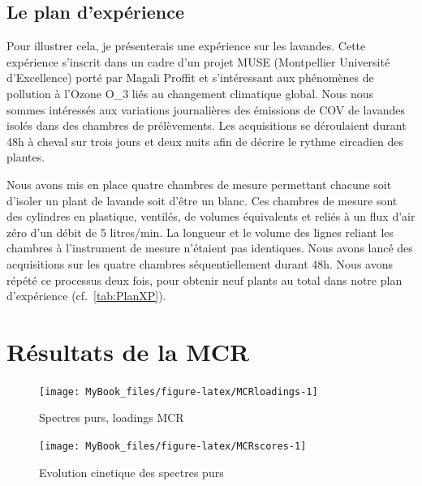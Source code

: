 \documentclass[
  12pt,
  american,
  a4paper,
  extrafontsizes,onecolumn,openright
  ]{memoir}
\begin{document}
\hypertarget{le-plan-dexpuxe9rience}{%
\subsection{Le plan d'expérience}\label{le-plan-dexpuxe9rience}}

Pour illustrer cela, je présenterais une expérience sur les lavandes. Cette expérience s'inscrit dans un cadre d'un projet MUSE (Montpellier Université d'Excellence) porté par Magali Proffit et s'intéressant aux phénomènes de pollution à l'Ozone O\_3 liés au changement climatique global. Nous nous sommes intéressés aux variations journalières des émissions de COV de lavandes isolés dans des chambres de prélèvements. Les acquisitions se déroulaient durant 48h à cheval sur trois jours et deux nuits afin de décrire le rythme circadien des plantes.

Nous avons mis en place quatre chambres de mesure permettant chacune soit d'isoler un plant de lavande soit d'être un blanc. Ces chambres de mesure sont des cylindres en plastique, ventilés, de volumes équivalents et reliés à un flux d'air zéro d'un débit de 5 litres/min. La longueur et le volume des lignes reliant les chambres à l'instrument de mesure n'étaient pas identiques. Nous avons lancé des acquisitions sur les quatre chambres séquentiellement durant 48h. Nous avons répété ce processus deux fois, pour obtenir neuf plants au total dans notre plan d'expérience (cf.~\ref{tab:PlanXP}).

\scriptsize

\normalsize

\hypertarget{ruxe9sultats-de-la-mcr}{%
\section{Résultats de la MCR}\label{ruxe9sultats-de-la-mcr}}

\scriptsize

\begin{figure}

{\centering \texttt{[image: MyBook\_files/figure-latex/MCRloadings-1]} 

}

\caption{Spectres purs, loadings MCR}\label{fig:MCRloadings}
\end{figure}

\normalsize

\scriptsize

\begin{figure}

{\centering \texttt{[image: MyBook\_files/figure-latex/MCRscores-1]} 

}

\caption{Evolution cinetique des spectres purs}\label{fig:MCRscores}
\end{figure}
\end{document}

